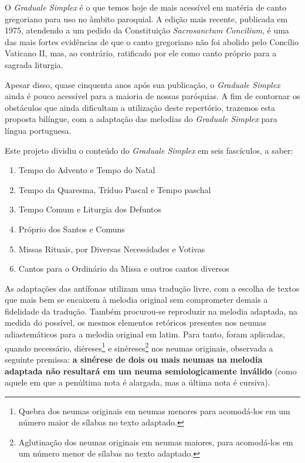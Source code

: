 \newcommand{\GR}{\emph{Graduale Romanum}}
\newcommand{\GS}{\emph{Graduale Simplex}}
\newcommand{\KS}{\emph{Kyriale Simplex}}
\newcommand{\Al}{\emph{Allelúia}}
\newcommand{\Schola}{\emph{schola}}
\newcommand{\ScholaC}{\emph{schola cantorum}}
\newcommand{\FirstPara}[1]{\noindent\textcolor{gregoriocolor}{#1.}}
\newcommand{\Para}[1]{\vspace{\baselineskip}\noindent\textcolor{gregoriocolor}{#1.}}



O {\GS} é o que temos hoje de mais acessível em matéria de canto gregoriano para uso no âmbito paroquial. A edição mais recente, publicada em 1975, atendendo a um pedido da Constituição \emph{Sacrosanctum Concilium}, é uma das mais fortes evidências de que o canto gregoriano não foi abolido pelo Concílio Vaticano II, mas, ao contrário, ratificado por ele como canto próprio para a sagrada liturgia.

Apesar disso, quase cinquenta anos após sua publicação, o {\GS} ainda é pouco acessível para a maioria de nossas paróquias. A fim de contornar os obstáculos que ainda dificultam a utilização deste repertório, trazemos esta proposta bilíngue, com a adaptação das melodias do {\GS} para língua portuguesa.


Este projeto dividiu o conteúdo do {\GS} em seis fascículos, a saber:
\begin{enumerate}[I:]
  \item Tempo do Advento e Tempo do Natal
  \item Tempo da Quaresma, Tríduo Pascal e Tempo paschal
  \item Tempo Comum e Liturgia dos Defuntos
  \item Próprio dos Santos e Comuns
  \item Missas Rituais, por Diversas Necessidades e Votivas
  \item Cantos para o Ordinário da Missa e outros cantos diversos
\end{enumerate}

As adaptações das antífonas utilizam uma tradução livre, com a escolha de textos que mais bem se encaixem à melodia original sem comprometer demais a fidelidade da tradução. Também procurou-se reproduzir na melodia adaptada, na medida do possível, os mesmos elementos retóricos presentes nos neumas adiastemáticos para a melodia original em latim. Para tanto, foram aplicadas, quando necessário, diéreses\footnote{Quebra dos neumas originais em neumas menores para acomodá-los em um número maior de sílabas no texto adaptado.} e sinéreses\footnote{Aglutinação dos neumas originais em neumas maiores, para acomodá-los em um número menor de sílabas no texto adaptado.} nos neumas originais, observada a seguinte premissa: \textbf{a sinérese de dois ou mais neumas na melodia adaptada não resultará em um neuma semiologicamente inválido} (como aquele em que a penúltima nota é alargada, mas a última nota é cursiva).

